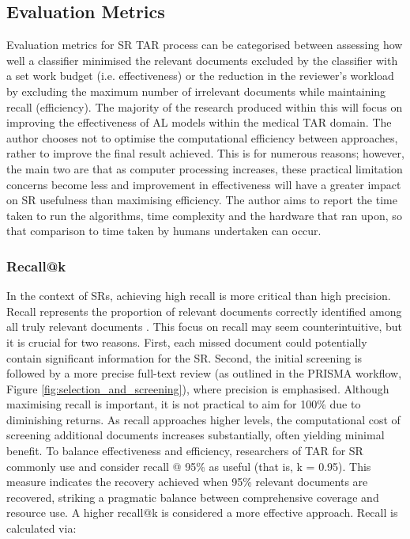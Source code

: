 \documentclass[../main.tex]{subfiles}
\begin{document}
\subsection{Evaluation Metrics}
Evaluation metrics for SR TAR process can be categorised between assessing how well a classifier minimised the relevant documents excluded by the classifier with a set work budget (i.e. effectiveness) or the reduction in the reviewer's workload by excluding the maximum number of irrelevant documents while maintaining recall (efficiency).  The majority of the research produced within this will focus on improving the effectiveness of AL models within the medical TAR domain. The author chooses not to optimise the computational efficiency between approaches, rather to improve the final result achieved. This is for numerous reasons; however, the main two are that as computer processing increases, these practical limitation concerns become less and improvement in effectiveness will have a greater impact on SR usefulness than maximising efficiency.  The author aims to report the time taken to run the algorithms, time complexity and the hardware that ran upon, so that comparison to time taken by humans undertaken can occur.

\subsubsection{Recall@k}
In the context of SRs, achieving high recall is more critical than high precision. Recall represents the proportion of relevant documents correctly identified among all truly relevant documents \cite{omara-eves_using_2015}. This focus on recall may seem counterintuitive, but it is crucial for two reasons. First, each missed document could potentially contain significant information for the SR. Second, the initial screening is followed by a more precise full-text review (as outlined in the PRISMA workflow, Figure \ref{fig:selection_and_screening}), where precision is emphasised.
Although maximising recall is important, it is not practical to aim for 100\% due to diminishing returns. As recall approaches higher levels, the computational cost of screening additional documents increases substantially, often yielding minimal benefit. To balance effectiveness and efficiency, researchers of TAR for SR commonly use and consider recall @ 95\% as useful (that is, k = 0.95). This measure indicates the recovery achieved when 95\% relevant documents are recovered, striking a pragmatic balance between comprehensive coverage and resource use. A higher recall@k is considered a more effective approach.
Recall is calculated via:
\end{document}
